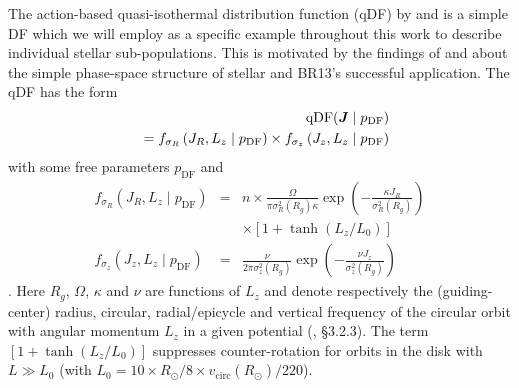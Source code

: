 The action-based quasi-isothermal distribution function (qDF) by \citet{2010MNRAS.401.2318B} and \citet{2011MNRAS.413.1889B} is a simple DF which we will employ as a specific example throughout this work to describe individual stellar sub-populations. This is motivated by the findings of \citet{2012ApJ...751..131B,2012ApJ...755..115B,2012ApJ...753..148B} and \citet{2013MNRAS.434..652T} about the simple phase-space structure of stellar \MAPs{} and BR13's successful application. The qDF has the form
\begin{eqnarray}
&&\text{qDF}(\boldsymbol{J} \mid p_\text{DF}) \nonumber\\
&&= f_{\sigma_R}\left(J_R,L_z \mid p_\text{DF}\right) \times f_{\sigma_z}\left(J_z,L_z \mid p_\text{DF}\right)\label{eq:df_general}\end{eqnarray}
with some free parameters $p_\text{DF}$ and
\begin{eqnarray}
f_{\sigma_R}\left(J_R,L_z \mid p_\text{DF}\right) &=& n \times \frac{\Omega}{\pi\sigma_R^2(R_g) \kappa}\exp\left(-\frac{\kappa J_R}{\sigma_R^2(R_g)} \right) \nonumber\\
&& \times \left[1+\tanh\left(L_z/L_0\right) \right]\\
f_{\sigma_z}\left(J_z,L_z \mid p_\text{DF} \right) &=& \frac{\nu}{2 \pi \sigma_z^2(R_g)} \exp\left( -\frac{\nu J_z}{\sigma_z^2(R_g)} \right)
\end{eqnarray}
\citep{2011MNRAS.413.1889B}.  Here $R_g$, $\Omega$,  $\kappa$ and $\nu$ are functions of $L_z$ and denote respectively the (guiding-center) radius, circular, radial/epicycle and vertical frequency of the circular orbit with angular momentum $L_z$ in a given potential (\citealt{2008gady.book.....B}, \S 3.2.3). The term $\left[1+\tanh\left(L_z/L_0\right) \right]$ suppresses counter-rotation for orbits in the disk with $L \gg L_0$ (with $L_0 = 10 \times R_\odot/8 \times v_\text{circ}(R_\odot)/220$).

